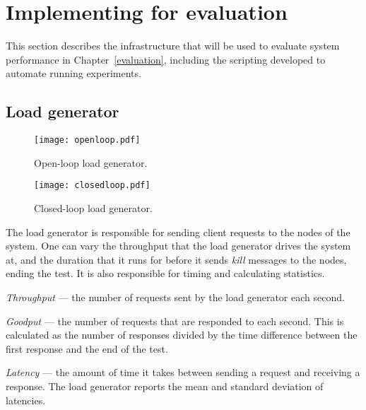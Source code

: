 
\section{Implementing for evaluation} \label{benchcode}

This section describes the infrastructure that will be used to evaluate system performance in Chapter~\ref{evaluation}, including the scripting developed to automate running experiments.

\subsection{Load generator} \label{loadgenerator}

\begin{figure}[h]
\centering
\texttt{[image: openloop.pdf]}
\caption{Open-loop load generator.}
\label{openloop}
\end{figure}

\begin{figure}[h]
\centering
\texttt{[image: closedloop.pdf]}
\caption{Closed-loop load generator.}
\label{closedloop}
\end{figure}

The load generator is responsible for sending client requests to the nodes of the system. One can vary the throughput that the load generator drives the system at, and the duration that it runs for before it sends \textit{kill} messages to the nodes, ending the test. It is also responsible for timing and calculating statistics.

\begin{description}
	\item \textit{Throughput} --- the number of requests sent by the load generator each second.
	\item \textit{Goodput} --- the number of requests that are responded to each second. This is calculated as the number of responses divided by the time difference between the first response and the end of the test.
	\item \textit{Latency} --- the amount of time it takes between sending a request and receiving a response. The load generator reports the mean and standard deviation of latencies.
\end{description}

